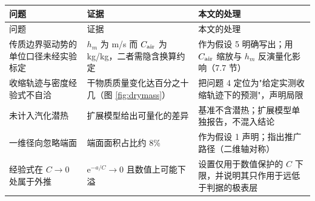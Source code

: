 \begin{center}
\small
\begin{longtable}{@{}p{4.2cm}p{4.0cm}p{6.3cm}@{}}
\toprule
问题 & 证据 & 本文的处理 \\
\midrule
\endfirsthead
\toprule
问题 & 证据 & 本文的处理 \\
\midrule
\endhead
传质边界驱动势的单位口径未经实验标定
 & $h_m$ 为 m/s 而 $C_{\mathrm{air}}$ 为 kg/kg，二者需隐含换算约定
 & 作为假设 5 明确写出；用 $C_{\mathrm{air}}$ 缩放与 $h_m$ 反演量化影响（7.7 节） \\
收缩轨迹与密度经验式不自洽
 & 干物质质量变化达百分之十几（图 \ref{fig:drymass}）
 & 把问题 4 定位为"给定实测收缩轨迹下的预测"，声明局限 \\
未计入汽化潜热
 & 扩展模型给出可量化的差异
 & 基准不含潜热；扩展模型单独报告，不混入结论 \\
一维径向忽略端面
 & 端面面积占比约 8\%
 & 作为假设 1 声明；指出推广路径（二维轴对称） \\
经验式在 $C\to0$ 处属于外推
 & $\mathrm{e}^{-a/C}\to0$ 且数值上可能下溢
 & 设置仅用于数值保护的 $C$ 下限，并说明其只作用于远低于判据的极表层 \\
\bottomrule
\end{longtable}
\end{center}
